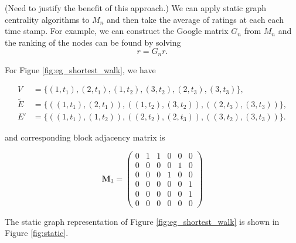 \documentclass[12pt]{article}
\theoremstyle{definition}
\begin{document}
(Need to justify the benefit of this approach.)
We can apply static graph centrality algorithms to $M_n$ and then take the average of ratings at each each time stamp. For example, we can construct the Google matrix
$G_n$ from $M_n$ and the ranking of the nodes can be found by solving
$$
 r= G_n r.
$$

For Figue \ref{fig:eg_shortest_walk}, we have

\begin{align*}
V & = \{(1,\!t_1), (2,\!t_1), (1,\!t_2), (3,\!t_2), (2,\!t_3), (3,\!t_3)\},\\
\tilde E &= \{((1,\!t_1), (2,\!t_1)), ((1,\!t_2), (3,\!t_2)), ((2,\!t_3), (3,\!t_3))\},\\
E'  &= \{((1,\!t_1), (1,\!t_2)), ((2,\!t_2), (2,\!t_3)), ((3,\!t_2), (3,\!t_3))\}.
\end{align*}

and corresponding block adjacency matrix is

\[
\bm M_3 = \begin{pmatrix}
0 & 1 & 1 & 0 & 0 & 0 \\
0 & 0 & 0 & 0 & 1 & 0 \\
0 & 0 & 0 & 1 & 0 & 0 \\
0 & 0 & 0 & 0 & 0 & 1 \\
0 & 0 & 0 & 0 & 0 & 1 \\
0 & 0 & 0 & 0 & 0 & 0
\end{pmatrix}
\]

The static graph representation of Figure \ref{fig:eg_shortest_walk} is shown in Figure \ref{fig:static}.
\end{document}
